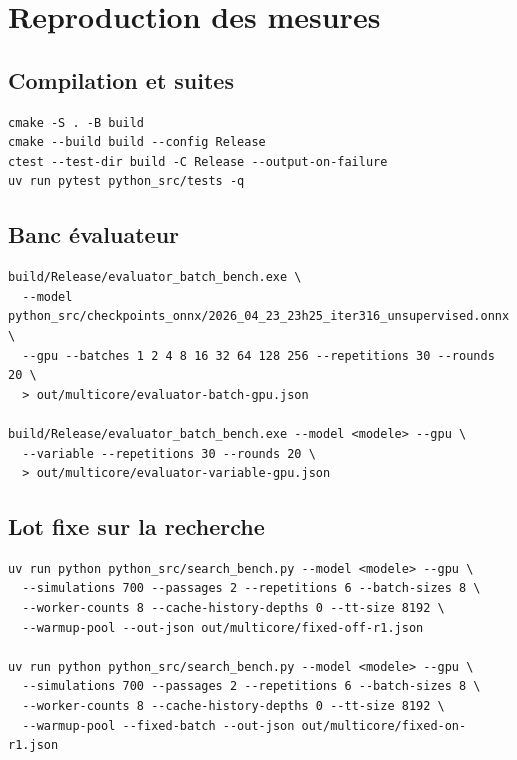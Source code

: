 \section{Reproduction des mesures}

\subsection{Compilation et suites}

\begin{lstlisting}[language={},caption={Depuis la racine du d\'ep\^ot.}]
cmake -S . -B build
cmake --build build --config Release
ctest --test-dir build -C Release --output-on-failure
uv run pytest python_src/tests -q
\end{lstlisting}

\subsection{Banc \'evaluateur}

\begin{lstlisting}[language={},caption={Courbe du lot et A/B alternance.}]
build/Release/evaluator_batch_bench.exe \
  --model python_src/checkpoints_onnx/2026_04_23_23h25_iter316_unsupervised.onnx \
  --gpu --batches 1 2 4 8 16 32 64 128 256 --repetitions 30 --rounds 20 \
  > out/multicore/evaluator-batch-gpu.json

build/Release/evaluator_batch_bench.exe --model <modele> --gpu \
  --variable --repetitions 30 --rounds 20 \
  > out/multicore/evaluator-variable-gpu.json
\end{lstlisting}

\subsection{Lot fixe sur la recherche}

\begin{lstlisting}[language={},caption={A/B interleaved, 8 workers puis mono.}]
uv run python python_src/search_bench.py --model <modele> --gpu \
  --simulations 700 --passages 2 --repetitions 6 --batch-sizes 8 \
  --worker-counts 8 --cache-history-depths 0 --tt-size 8192 \
  --warmup-pool --out-json out/multicore/fixed-off-r1.json

uv run python python_src/search_bench.py --model <modele> --gpu \
  --simulations 700 --passages 2 --repetitions 6 --batch-sizes 8 \
  --worker-counts 8 --cache-history-depths 0 --tt-size 8192 \
  --warmup-pool --fixed-batch --out-json out/multicore/fixed-on-r1.json
\end{lstlisting}

